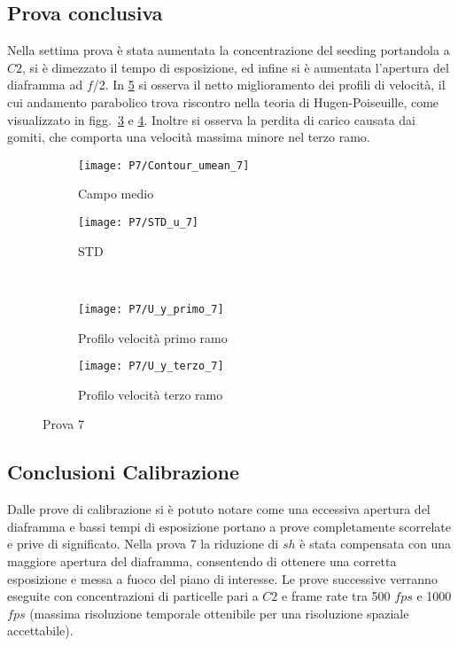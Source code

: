 \documentclass{article} %
\begin{document}
\subsection{Prova conclusiva}
Nella settima prova è stata aumentata la concentrazione del seeding portandola a $C2$, si è dimezzato il tempo di esposizione, ed infine si è aumentata l'apertura del diaframma ad $f$/2. In \cref{fig:cmstd_P7} si osserva il netto miglioramento dei profili di velocità, il cui andamento parabolico trova riscontro nella teoria di Hugen-Poiseuille, come visualizzato in figg.~\ref{fig:pvr1_p7} e \ref{fig:pvr3_p7}. Inoltre si osserva la perdita di carico causata dai gomiti, che comporta una velocità massima minore nel terzo ramo.\par
\begin{figure}[h!] %
	\centering
	\begin{subfigure}{0.3\textwidth}
		\texttt{[image: P7/Contour\_umean\_7]}
		\caption{Campo medio}
		\label{fig:cm_p7}
	\end{subfigure} \quad
	\begin{subfigure}{0.3\textwidth}
		\texttt{[image: P7/STD\_u\_7]}
		\caption{STD}
		\label{fig:std_p7}
	\end{subfigure} \\
	\begin{subfigure}{0.3\textwidth}
		\texttt{[image: P7/U\_y\_primo\_7]}
		\caption{Profilo velocità primo ramo}
		\label{fig:pvr1_p7}	
	\end{subfigure} \quad
	\begin{subfigure}{0.3\textwidth}
		\texttt{[image: P7/U\_y\_terzo\_7]}
		\caption{Profilo velocità terzo ramo}
		\label{fig:pvr3_p7}	
	\end{subfigure}	
	\caption{Prova 7}
	\label{fig:cmstd_P7}
\end{figure}
\subsection{Conclusioni Calibrazione}
Dalle prove di calibrazione si è potuto notare come una eccessiva apertura del diaframma e bassi tempi di esposizione portano a prove completamente scorrelate e prive di significato. Nella prova 7 la riduzione di $sh$ è stata compensata con una maggiore apertura del diaframma, consentendo di ottenere una corretta esposizione e messa a fuoco del piano di interesse. Le prove successive verranno eseguite con concentrazioni di particelle pari a $C2$ e frame rate tra 500 $fps$ e 1000 $fps$ (massima risoluzione temporale ottenibile per una risoluzione spaziale accettabile).
\clearpage
\end{document}
